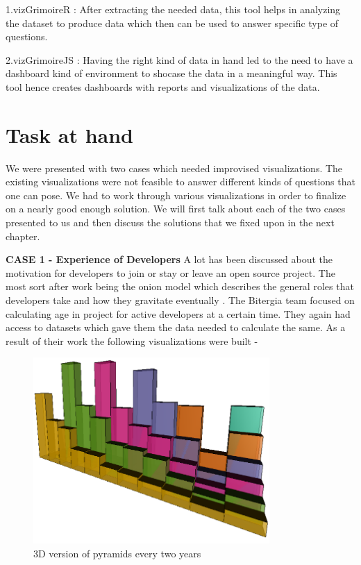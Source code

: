 \documentclass[double,12pt]{beavtex}
\begin{document}
1.vizGrimoireR : After extracting the needed data, this tool helps in analyzing the dataset to produce data which then can be used to answer specific type of questions.

2.vizGrimoireJS : Having the right kind of data in hand led to the need to have a dashboard kind of environment to shocase the data in a meaningful way. This tool hence creates dashboards with reports and visualizations of the data.

\section{Task at hand}
We were presented with two cases which needed improvised visualizations. The existing visualizations were not feasible to answer different kinds of questions that one can pose. We had to work through various visualizations in order to finalize on a nearly good enough solution. We will first talk about each of the two cases presented to us and then discuss the solutions that we fixed upon in the next chapter.

\textbf{CASE 1 - Experience of Developers}
A lot has been discussed about the motivation for developers to join or stay or leave an open source project. The most sort after work being the onion model which describes the general roles that developers take and how they gravitate eventually \cite{crowston2005,  kishida2003}. The Bitergia team focused on calculating age in project for active developers at a certain time. They again had access to datasets which gave them the data needed to calculate the same. As a result of their work the following visualizations were built - 

\begin{figure}[!ht]
\centering
\includegraphics[width=90mm]{age2.png}
\caption{3D version of pyramids every two years}
\end{figure}
\end{document}
